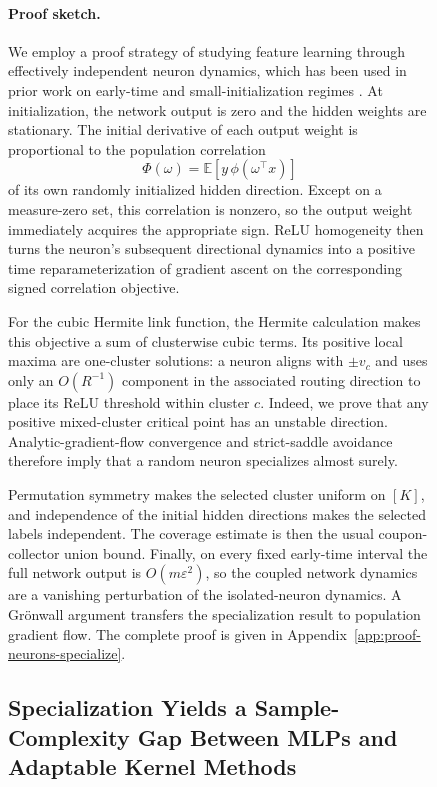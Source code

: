\documentclass{article}
\newcounter{initialization}[section]
\begin{document}
\begin{figure}
\paragraph{Proof sketch.}
We employ a proof strategy of studying feature learning
through effectively independent neuron dynamics, which has been used in prior
work on early-time and small-initialization regimes
\citep{abbe2022merged,min2024early,glasgow2024sgd}.
At initialization, the network output is zero and the hidden weights are
stationary. The initial derivative of each output weight is proportional to
the population correlation
\[
    \Phi(\omega)
    =\mathbb E\left[y\,
      \phi(\omega^\top x)\right]
\]
of its own randomly initialized hidden direction. Except on a measure-zero
set, this correlation is nonzero, so the output weight immediately acquires
the appropriate sign. ReLU homogeneity then turns the neuron's subsequent
directional dynamics into a positive time reparameterization of gradient
ascent on the corresponding signed correlation objective.

For the cubic Hermite link function, the Hermite calculation makes this objective a sum of
clusterwise cubic terms. Its positive local maxima are one-cluster solutions:
a neuron aligns with $\pm v_c$ and uses only an $O(R^{-1})$ component
in the associated routing direction to place its ReLU threshold within
cluster $c$. Indeed, we prove that any positive mixed-cluster critical point has an unstable
direction. Analytic-gradient-flow convergence and strict-saddle avoidance
therefore imply that a random neuron specializes almost surely.

Permutation symmetry makes the selected cluster uniform on $[K]$, and
independence of the initial hidden directions makes the selected labels
independent. The coverage estimate is then the usual coupon-collector union
bound. Finally, on every fixed early-time interval the full network output is
$O(m\varepsilon^2)$, so the coupled network dynamics are a vanishing
perturbation of the isolated-neuron dynamics. A Gr\"onwall argument transfers
the specialization result to population gradient flow. The complete proof is
given in Appendix~\ref{app:proof-neurons-specialize}.



\subsection{Specialization Yields a Sample-Complexity Gap Between MLPs and Adaptable Kernel Methods}
\label{sec:mlp-rfm-separation}


\end{figure}
\end{document}
